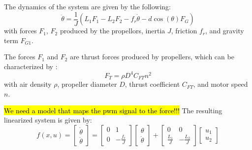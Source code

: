 
The dynamics of the system are given by the following:
\begin{equation}
    \ddot\theta = \frac{1}{J}(L_1F_1-L_2F_2-f_r\dot\theta-d\cos(\theta)F_{G})
    \label{eq:dyn-double-flying-arm}
\end{equation}
with forces $F_1$, $F_2$ produced by the propellors, inertia $J$, friction $f_r$, and gravity term $F_{G1}$. 

The forces $F_1$ and $F_2$ are thrust forces produced by propellers, which can be characterized by \cite{ducardFaulttolerantFlightControl2009}:
\begin{equation}
    F_T = \rho D^4 C_{FT}n^2
    \label{eq:thrust}
\end{equation}
with air density $\rho$, propeller diameter $D$, thrust coefficient $C_{FT}$, and motor speed $n$.

\hl{We need a model that maps the pwm signal to the force!!!}
The resulting linearized system is given by:
\begin{equation}
    f(x,u) = 
    \begin{bmatrix}
        \dot\theta \\
        \ddot \theta
    \end{bmatrix} 
    = 
    \begin{bmatrix}
        0 & 1 \\
        0 & -\frac{f_r}{J}
    \end{bmatrix}
    \begin{bmatrix}
        \theta \\
        \dot\theta
    \end{bmatrix}
    +
    \begin{bmatrix}
        0 & 0 \\
        \frac{L_1}{J} & -\frac{L_2}{J}
    \end{bmatrix}
    \begin{bmatrix}
        u_1 \\ 
        u_2
    \end{bmatrix}
    \label{eq:sys-linearized}
\end{equation}